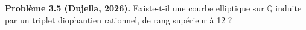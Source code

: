 \textbf{Problème 3.5 (Dujella, 2026).} Existe-t-il une courbe elliptique sur $\mathbb{Q}$ induite par un triplet diophantien rationnel, de rang supérieur à 12 ?
